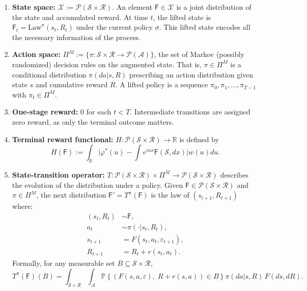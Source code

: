 \documentclass[reqno, 11pt]{amsart}%
\newcommand\RR{\mathbb R}
\theoremstyle{definition}
\begin{document}
\begin{enumerate}
\item[a)] \textbf{State space:} $\mathcal{X} := \mathcal{P}(\mathcal{S} \times \mathcal{R})$. An element $\mathsf F \in \mathcal{X}$ is a joint distribution of the state and accumulated reward. At time $t$, the lifted state is $\mathsf F_t = \text{Law}^\sigma(s_t, R_t)$ under the current policy $\sigma$. This lifted state encodes all the necessary information of the process.

\item[b)] \textbf{Action space:} $\Pi^M := \{\pi: \mathcal{S} \times \mathcal{R} \to \mathcal{P}(\mathcal{A})\}$, the set of Markov (possibly randomized) decision rules on the augmented state. That is, $\pi \in \Pi^M$ is a conditional distribution $\pi(da|s, R)$ prescribing an action distribution given state $s$ and cumulative reward $R$. A lifted policy is a sequence $\pi_0, \pi_1, \ldots, \pi_{T-1}$ with $\pi_t \in \Pi^M$.

\item[c)] \textbf{One-stage reward:} $0$ for each $t < T$. Intermediate transitions are assigned zero reward, as only the terminal outcome matters.

\item[d)] \textbf{Terminal reward functional:} $H: \mathcal{P}(\mathcal{S} \times \mathcal{R}) \to \mathbb{R}$ is defined by
\[
H(\mathsf F) := \int_\RR \Big|\varphi^*(u)- \int e^{iux} \mathsf F(\mathcal{S},dx)\Big|w(u)du.
\]

\item[e)] \textbf{State-transition operator:} $T: \mathcal{P}(\mathcal{S} \times \mathcal{R}) \times \Pi^M \to \mathcal{P}(\mathcal{S} \times \mathcal{R})$ describes the evolution of the distribution under a policy. Given $\mathsf F \in \mathcal{P}(\mathcal{S} \times \mathcal{R})$ and $\pi \in \Pi^M$, the next distribution $\mathsf F' = T^{\pi}(\mathsf F)$ is the law of $(s_{t+1}, R_{t+1})$ where:
\[
\begin{aligned}
(s_t, R_t) &\sim \mathsf F, \\
a_t &\sim \pi(\cdot | s_t, R_t), \\
s_{t+1} &= F(s_t, a_t, \varepsilon_{t+1}), \\
R_{t+1} &= R_t + r(s_t, a_t).
\end{aligned}
\]
Formally, for any measurable set $B \subseteq \mathcal{S} \times \mathcal{R}$,
\[
T^{\pi}(\mathsf F)(B) = \int_{\mathcal{S} \times \mathcal{R}} \int_{\mathcal{A}} \mathbb{P}\left\{ (F(s,a,\varepsilon),\; R + r(s,a)) \in B \right\} \pi(da|s,R)\,F(ds,dR).
\]
\end{enumerate}
\end{document}
